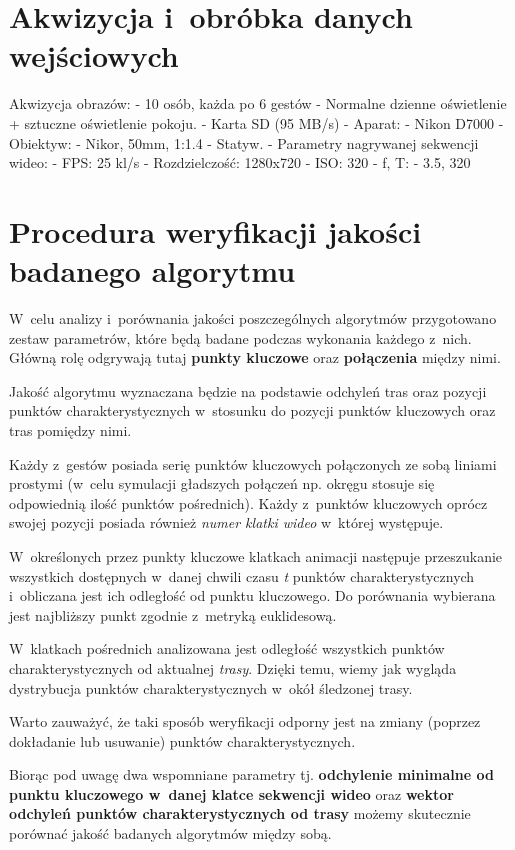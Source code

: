   \section{Akwizycja i~obróbka danych wejściowych}\label{Section_Akwizycja}

  Akwizycja obrazów:
  - 10 osób, każda po 6 gestów
  - Normalne dzienne oświetlenie + sztuczne oświetlenie pokoju.
  - Karta SD (95 MB/s)
  - Aparat:
    - Nikon D7000
  - Obiektyw:
    - Nikor, 50mm, 1:1.4
  - Statyw.
  - Parametry nagrywanej sekwencji wideo:
    - FPS: 25 kl/s
    - Rozdzielczość: 1280x720
    - ISO: 320
    - f, T:
      - 3.5, 320

  \section{Procedura weryfikacji jakości badanego algorytmu}\label{Section_Jakosc}

    W~celu analizy i~porównania jakości poszczególnych algorytmów przygotowano zestaw parametrów, które będą badane podczas wykonania każdego z~nich. Główną rolę odgrywają tutaj \textbf{punkty kluczowe} oraz \textbf{połączenia} między nimi.

    Jakość algorytmu wyznaczana będzie na podstawie odchyleń tras oraz pozycji punktów charakterystycznych w~stosunku do pozycji punktów kluczowych oraz tras pomiędzy nimi.

    Każdy z~gestów posiada serię punktów kluczowych połączonych ze sobą liniami prostymi (w~celu symulacji gładszych połączeń np. okręgu stosuje się odpowiednią ilość punktów pośrednich). Każdy z~punktów kluczowych oprócz swojej pozycji posiada również \textit{numer klatki wideo} w~której występuje.

    W~określonych przez punkty kluczowe klatkach animacji następuje przeszukanie wszystkich dostępnych w~danej chwili czasu \textit{t} punktów charakterystycznych i~obliczana jest ich odległość od punktu kluczowego. Do porównania wybierana jest najbliższy punkt zgodnie z~metryką euklidesową.

    W~klatkach pośrednich analizowana jest odległość wszystkich punktów charakterystycznych od aktualnej \textit{trasy}. Dzięki temu, wiemy jak wygląda dystrybucja punktów charakterystycznych w~okół śledzonej trasy.

    Warto zauważyć, że taki sposób weryfikacji odporny jest na zmiany (poprzez dokładanie lub usuwanie) punktów charakterystycznych.

    Biorąc pod uwagę dwa wspomniane parametry tj. \textbf{odchylenie minimalne od punktu kluczowego w~danej klatce sekwencji wideo} oraz \textbf{wektor odchyleń punktów charakterystycznych od trasy} możemy skutecznie porównać jakość badanych algorytmów między sobą.

